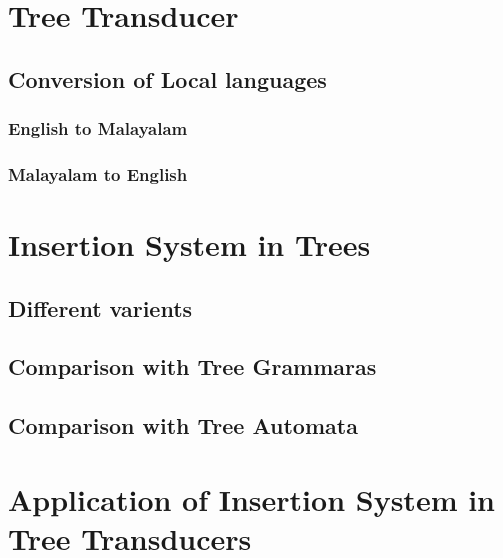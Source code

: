 
\section{Tree Transducer}
\subsection{Conversion of Local languages}
\subsubsection{English to Malayalam}
\subsubsection{Malayalam to English}
\section{Insertion System in Trees}
\subsection{Different varients}
\subsection{Comparison with Tree Grammaras}
\subsection{Comparison with Tree Automata}
\section{Application of Insertion System in Tree Transducers}


